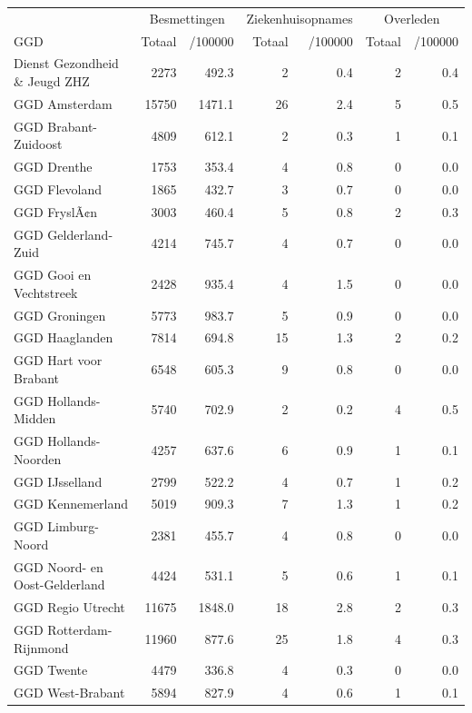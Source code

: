 \documentclass[
  english,
  man,floatsintext]{apa6}
\begin{document}
\begin{table}
\centering\begingroup\fontsize{10}{12}\selectfont

\begin{threeparttable}
\begin{tabular}{lrrrrrr}
\toprule
\multicolumn{1}{c}{ } & \multicolumn{2}{c}{Besmettingen} & \multicolumn{2}{c}{Ziekenhuisopnames} & \multicolumn{2}{c}{Overleden} \\
\cmidrule(l{3pt}r{3pt}){2-3} \cmidrule(l{3pt}r{3pt}){4-5} \cmidrule(l{3pt}r{3pt}){6-7}
GGD & Totaal & /100000 & Totaal & /100000 & Totaal & /100000\\
\midrule
Dienst Gezondheid \& Jeugd ZHZ & 2273 & 492.3 & 2 & 0.4 & 2 & 0.4\\
GGD Amsterdam & 15750 & 1471.1 & 26 & 2.4 & 5 & 0.5\\
GGD Brabant-Zuidoost & 4809 & 612.1 & 2 & 0.3 & 1 & 0.1\\
GGD Drenthe & 1753 & 353.4 & 4 & 0.8 & 0 & 0.0\\
GGD Flevoland & 1865 & 432.7 & 3 & 0.7 & 0 & 0.0\\
GGD FryslÃ¢n & 3003 & 460.4 & 5 & 0.8 & 2 & 0.3\\
GGD Gelderland-Zuid & 4214 & 745.7 & 4 & 0.7 & 0 & 0.0\\
GGD Gooi en Vechtstreek & 2428 & 935.4 & 4 & 1.5 & 0 & 0.0\\
GGD Groningen & 5773 & 983.7 & 5 & 0.9 & 0 & 0.0\\
GGD Haaglanden & 7814 & 694.8 & 15 & 1.3 & 2 & 0.2\\
GGD Hart voor Brabant & 6548 & 605.3 & 9 & 0.8 & 0 & 0.0\\
GGD Hollands-Midden & 5740 & 702.9 & 2 & 0.2 & 4 & 0.5\\
GGD Hollands-Noorden & 4257 & 637.6 & 6 & 0.9 & 1 & 0.1\\
GGD IJsselland & 2799 & 522.2 & 4 & 0.7 & 1 & 0.2\\
GGD Kennemerland & 5019 & 909.3 & 7 & 1.3 & 1 & 0.2\\
GGD Limburg-Noord & 2381 & 455.7 & 4 & 0.8 & 0 & 0.0\\
GGD Noord- en Oost-Gelderland & 4424 & 531.1 & 5 & 0.6 & 1 & 0.1\\
GGD Regio Utrecht & 11675 & 1848.0 & 18 & 2.8 & 2 & 0.3\\
GGD Rotterdam-Rijnmond & 11960 & 877.6 & 25 & 1.8 & 4 & 0.3\\
GGD Twente & 4479 & 336.8 & 4 & 0.3 & 0 & 0.0\\
GGD West-Brabant & 5894 & 827.9 & 4 & 0.6 & 1 & 0.1\\

\end{tabular}
\end{threeparttable}
\end{table}
\end{document}
